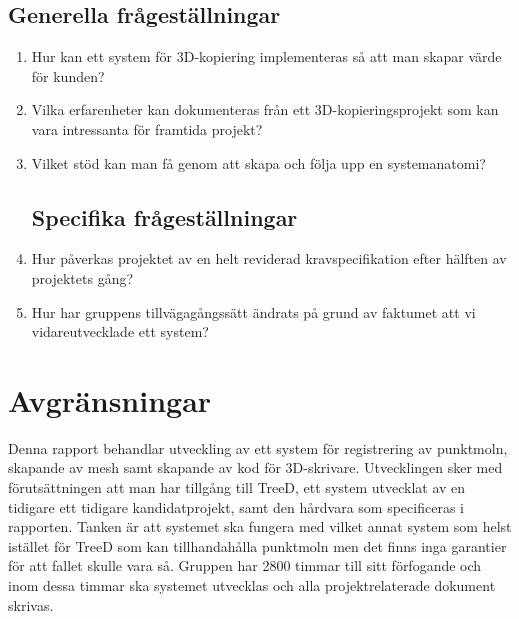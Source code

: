 \subsection{Generella frågeställningar}
\label{sec:research-questions-general}

\begin{enumerate}
	\item Hur kan ett system för 3D-kopiering implementeras så att man skapar värde för kunden?
	\item Vilka erfarenheter kan dokumenteras från ett 3D-kopieringsprojekt som kan vara intressanta för framtida projekt?
	\item Vilket stöd kan man få genom att skapa och följa upp en systemanatomi?
	
\subsection{Specifika frågeställningar}
\label{sec:research-questions-specific}
	
	\item Hur påverkas projektet av en helt reviderad kravspecifikation efter hälften av projektets gång?
	\item Hur har gruppens tillvägagångssätt ändrats på grund av faktumet att vi vidareutvecklade ett system? 
	
\end{enumerate}



\section{Avgränsningar}
\label{sec:delimitations}

Denna rapport behandlar utveckling av ett system för registrering av punktmoln, skapande av mesh samt skapande av kod för 3D-skrivare. Utvecklingen sker med förutsättningen att man har tillgång till TreeD, ett system utvecklat av en tidigare ett tidigare kandidatprojekt, samt den hårdvara som specificeras i rapporten. Tanken är att systemet ska fungera med vilket annat system som helst istället för TreeD som kan tillhandahålla punktmoln men det finns inga garantier för att fallet skulle vara så. Gruppen har 2800 timmar till sitt förfogande och inom dessa timmar ska systemet utvecklas och alla projektrelaterade dokument skrivas. 



